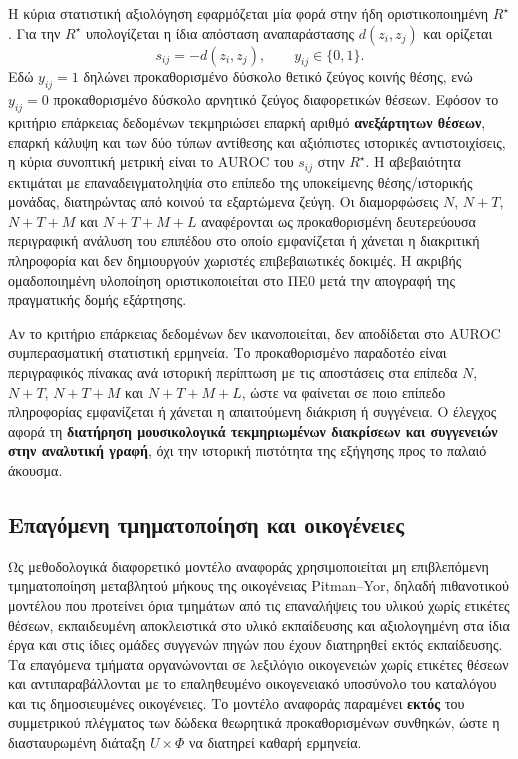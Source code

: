 \documentclass[11pt,a4paper]{article}
\begin{document}
Η κύρια στατιστική αξιολόγηση εφαρμόζεται μία φορά στην ήδη οριστικοποιημένη $R^\star$. Για την $R^\star$ υπολογίζεται η ίδια απόσταση αναπαράστασης $d(z_i,z_j)$ και ορίζεται
\[
s_{ij}=-d(z_i,z_j),\qquad y_{ij}\in\{0,1\}.
\]
Εδώ $y_{ij}=1$ δηλώνει προκαθορισμένο δύσκολο θετικό ζεύγος κοινής θέσης, ενώ $y_{ij}=0$ προκαθορισμένο δύσκολο αρνητικό ζεύγος διαφορετικών θέσεων.
Εφόσον το κριτήριο επάρκειας δεδομένων τεκμηριώσει επαρκή αριθμό \textbf{ανεξάρτητων θέσεων}, επαρκή κάλυψη και των δύο τύπων αντίθεσης και αξιόπιστες ιστορικές αντιστοιχίσεις, η κύρια συνοπτική μετρική είναι το AUROC του $s_{ij}$ στην $R^\star$. Η αβεβαιότητα εκτιμάται με επαναδειγματοληψία στο επίπεδο της υποκείμενης θέσης/ιστορικής μονάδας, διατηρώντας από κοινού τα εξαρτώμενα ζεύγη. Οι διαμορφώσεις $N$, $N{+}T$, $N{+}T{+}M$ και $N{+}T{+}M{+}L$ αναφέρονται ως προκαθορισμένη δευτερεύουσα περιγραφική ανάλυση του επιπέδου στο οποίο εμφανίζεται ή χάνεται η διακριτική πληροφορία και δεν δημιουργούν χωριστές επιβεβαιωτικές δοκιμές. Η ακριβής ομαδοποιημένη υλοποίηση οριστικοποιείται στο ΠΕ0 μετά την απογραφή της πραγματικής δομής εξάρτησης.

Αν το κριτήριο επάρκειας δεδομένων δεν ικανοποιείται, δεν αποδίδεται στο AUROC συμπερασματική στατιστική ερμηνεία. Το προκαθορισμένο παραδοτέο είναι περιγραφικός πίνακας ανά ιστορική περίπτωση με τις αποστάσεις στα επίπεδα $N$, $N{+}T$, $N{+}T{+}M$ και $N{+}T{+}M{+}L$, ώστε να φαίνεται σε ποιο επίπεδο πληροφορίας εμφανίζεται ή χάνεται η απαιτούμενη διάκριση ή συγγένεια. Ο έλεγχος αφορά τη \textbf{διατήρηση μουσικολογικά τεκμηριωμένων διακρίσεων και συγγενειών στην αναλυτική γραφή}, όχι την ιστορική πιστότητα της εξήγησης προς το παλαιό άκουσμα.

\subsection{Επαγόμενη τμηματοποίηση και οικογένειες}\label{sec:induced-segmentation}

Ως μεθοδολογικά διαφορετικό μοντέλο αναφοράς χρησιμοποιείται μη επιβλεπόμενη τμηματοποίηση μεταβλητού μήκους της οικογένειας Pitman--Yor, δηλαδή πιθανοτικού μοντέλου που προτείνει όρια τμημάτων από τις επαναλήψεις του υλικού χωρίς ετικέτες θέσεων, εκπαιδευμένη αποκλειστικά στο υλικό εκπαίδευσης και αξιολογημένη στα ίδια έργα και στις ίδιες ομάδες συγγενών πηγών που έχουν διατηρηθεί εκτός εκπαίδευσης. Τα επαγόμενα τμήματα οργανώνονται σε λεξιλόγιο οικογενειών χωρίς ετικέτες θέσεων και αντιπαραβάλλονται με το επαληθευμένο οικογενειακό υποσύνολο του καταλόγου και τις δημοσιευμένες οικογένειες. Το μοντέλο αναφοράς παραμένει \textbf{εκτός} του συμμετρικού πλέγματος των δώδεκα θεωρητικά προκαθορισμένων συνθηκών, ώστε η διασταυρωμένη διάταξη \(U\times\Phi\) να διατηρεί καθαρή ερμηνεία.
\end{document}
